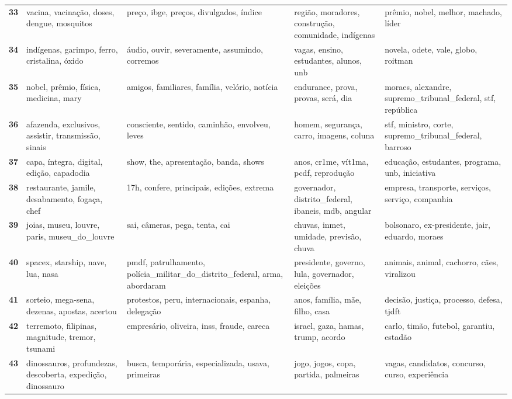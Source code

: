 \begin{xltabular}{\textwidth}{@{}l >{\RaggedRight\arraybackslash}X >{\RaggedRight\arraybackslash}X >{\RaggedRight\arraybackslash}X >{\RaggedRight\arraybackslash}X@{}}
    \textbf{33} & vacina, vacinação, doses, dengue, mosquitos & preço, ibge, preços, divulgados, índice & região, moradores, construção, comunidade, indígenas & prêmio, nobel, melhor, machado, líder \\
    \textbf{34} & indígenas, garimpo, ferro, cristalina, óxido & áudio, ouvir, severamente, assumindo, corremos & vagas, ensino, estudantes, alunos, unb & novela, odete, vale, globo, roitman \\
    \textbf{35} & nobel, prêmio, física, medicina, mary & amigos, familiares, família, velório, notícia & endurance, prova, provas, será, dia & moraes, alexandre, supremo\_tribunal\_federal, stf, república \\
    \textbf{36} & afazenda, exclusivos, assistir, transmissão, sinais & consciente, sentido, caminhão, envolveu, leves & homem, segurança, carro, imagens, coluna & stf, ministro, corte, supremo\_tribunal\_federal, barroso \\
    \textbf{37} & capa, íntegra, digital, edição, capadodia & show, the, apresentação, banda, shows & anos, cr1me, vít1ma, pcdf, reprodução & educação, estudantes, programa, unb, iniciativa \\
    \textbf{38} & restaurante, jamile, desabamento, fogaça, chef & 17h, confere, principais, edições, extrema & governador, distrito\_federal, ibaneis, mdb, angular & empresa, transporte, serviços, serviço, companhia \\
    \textbf{39} & joias, museu, louvre, paris, museu\_do\_louvre & sai, câmeras, pega, tenta, cai & chuvas, inmet, umidade, previsão, chuva & bolsonaro, ex-presidente, jair, eduardo, moraes \\
    \textbf{40} & spacex, starship, nave, lua, nasa & pmdf, patrulhamento, polícia\_militar\_do\_distrito\_federal, arma, abordaram & presidente, governo, lula, governador, eleições & animais, animal, cachorro, cães, viralizou \\
    \textbf{41} & sorteio, mega-sena, dezenas, apostas, acertou & protestos, peru, internacionais, espanha, delegação & anos, família, mãe, filho, casa & decisão, justiça, processo, defesa, tjdft \\
    \textbf{42} & terremoto, filipinas, magnitude, tremor, tsunami & empresário, oliveira, inss, fraude, careca & israel, gaza, hamas, trump, acordo & carlo, timão, futebol, garantiu, estadão \\
    \textbf{43} & dinossauros, profundezas, descoberta, expedição, dinossauro & busca, temporária, especializada, usava, primeiras & jogo, jogos, copa, partida, palmeiras & vagas, candidatos, concurso, curso, experiência \\

\end{xltabular}
